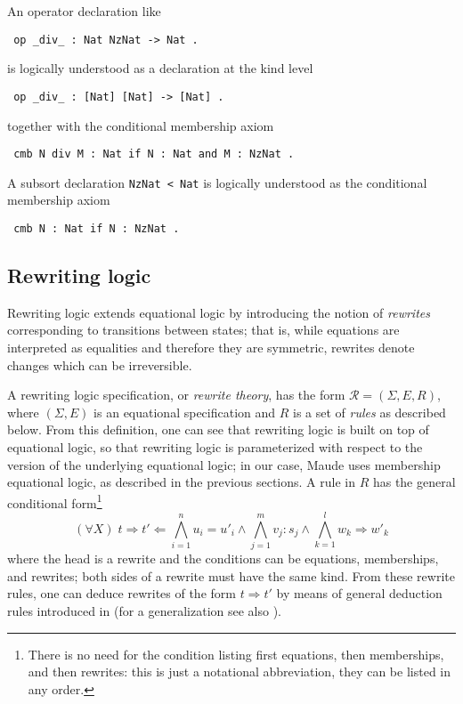 An operator declaration like

{\codesize
\begin{verbatim}
 op _div_ : Nat NzNat -> Nat .
\end{verbatim}
}

\noindent
is logically understood as a declaration at the kind level

{\codesize
\begin{verbatim}
 op _div_ : [Nat] [Nat] -> [Nat] .
\end{verbatim}
}

\noindent
together with the conditional membership axiom

{\codesize
\begin{verbatim}
 cmb N div M : Nat if N : Nat and M : NzNat .
\end{verbatim}
}

A subsort declaration \texttt{NzNat < Nat} is logically understood as
the conditional membership axiom

{\codesize
\begin{verbatim}
 cmb N : Nat if N : NzNat .
\end{verbatim}
}

\subsection{Rewriting logic}

Rewriting logic extends equational logic by introducing the notion of \emph{rewrites} 
corresponding to
transitions between states; that is, while equations are interpreted as equalities and therefore
they are symmetric, rewrites denote changes which can be irreversible. 

A rewriting logic specification, or \emph{rewrite theory}, has the form
$\mathcal{R} = (\Sigma,E,R)$, where $(\Sigma,E)$ is an equational specification
and $R$ is a set of \emph{rules} as described below. From this definition,
one can see that rewriting logic is built on top of equational logic, so
that rewriting logic is parameterized
with respect to the version of the underlying equational logic; in our
case, Maude uses membership equational logic, as described in the
previous sections. A rule in $R$ has the general conditional
form\footnote{There is no need for the condition listing first equations,
then  memberships, and then rewrites: this is just a notational
abbreviation, they can be listed in any order.} 
\[
(\forall X) \; t \Rightarrow t' \Leftarrow \bigwedge_{i=1}^{n} u_i = u'_i \wedge
                      \bigwedge_{j=1}^{m}  v_j : s_j \wedge
                      \bigwedge_{k=1}^{l} w_k \Rightarrow w'_k
\]
where the head is a rewrite and the conditions can be equations,
memberships, and rewrites; both sides of a rewrite must have the same kind. 
From these rewrite rules, one can deduce rewrites of the form
$t \Rightarrow t'$ by means of general deduction rules introduced
in \cite{Meseguer92-tcs} (for a generalization see also \cite{BruniMeseguer06}).

